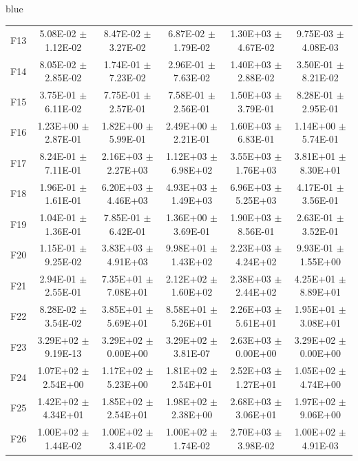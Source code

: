 \documentclass[journal, onecolumn]{IEEEtran}
\begin{document}
\begin{color}{blue}
\begin{table}[htbp!]
\begin{tabular}{c|ccccc}
			F13	 &	5.08E-02	$\pm$	1.12E-02		 &	8.47E-02	$\pm$	3.27E-02		 &	6.87E-02	$\pm$	1.79E-02		 &	1.30E+03	$\pm$	4.67E-02		 &	9.75E-03	$\pm$	4.08E-03	\\	
			F14	 &	8.05E-02	$\pm$	2.85E-02		 &	1.74E-01	$\pm$	7.23E-02		 &	2.96E-01	$\pm$	7.63E-02		 &	1.40E+03	$\pm$	2.88E-02		 &	3.50E-01	$\pm$	8.21E-02	\\	
			F15	 &	3.75E-01	$\pm$	6.11E-02		 &	7.75E-01	$\pm$	2.57E-01		 &	7.58E-01	$\pm$	2.56E-01		 &	1.50E+03	$\pm$	3.79E-01		 &	8.28E-01	$\pm$	2.95E-01	\\	
			F16	 &	1.23E+00	$\pm$	2.87E-01		 &	1.82E+00	$\pm$	5.99E-01		 &	2.49E+00	$\pm$	2.21E-01		 &	1.60E+03	$\pm$	6.83E-01		 &	1.14E+00	$\pm$	5.74E-01	\\	
			F17	 &	8.24E-01	$\pm$	7.11E-01		 &	2.16E+03	$\pm$	2.27E+03		 &	1.12E+03	$\pm$	6.98E+02		 &	3.55E+03	$\pm$	1.76E+03		 &	3.81E+01	$\pm$	8.30E+01	\\	
			F18	 &	1.96E-01	$\pm$	1.61E-01		 &	6.20E+03	$\pm$	4.46E+03		 &	4.93E+03	$\pm$	1.49E+03		 &	6.96E+03	$\pm$	5.25E+03		 &	4.17E-01	$\pm$	3.56E-01	\\	
			F19	 &	1.04E-01	$\pm$	1.36E-01		 &	7.85E-01	$\pm$	6.42E-01		 &	1.36E+00	$\pm$	3.69E-01		 &	1.90E+03	$\pm$	8.56E-01		 &	2.63E-01	$\pm$	3.52E-01	\\	
			F20	 &	1.15E-01	$\pm$	9.25E-02		 &	3.83E+03	$\pm$	4.91E+03		 &	9.98E+01	$\pm$	1.43E+02		 &	2.23E+03	$\pm$	4.24E+02		 &	9.93E-01	$\pm$	1.55E+00	\\	
			F21	 &	2.94E-01	$\pm$	2.55E-01		 &	7.35E+01	$\pm$	7.08E+01		 &	2.12E+02	$\pm$	1.60E+02		 &	2.38E+03	$\pm$	2.44E+02		 &	4.25E+01	$\pm$	8.89E+01	\\	
			F22	 &	8.28E-02	$\pm$	3.54E-02		 &	3.85E+01	$\pm$	5.69E+01		 &	8.58E+01	$\pm$	5.26E+01		 &	2.26E+03	$\pm$	5.61E+01		 &	1.95E+01	$\pm$	3.08E+01	\\	
			F23	 &	3.29E+02	$\pm$	9.19E-13		 &	3.29E+02	$\pm$	0.00E+00		 &	3.29E+02	$\pm$	3.81E-07		 &	2.63E+03	$\pm$	0.00E+00		 &	3.29E+02	$\pm$	0.00E+00	\\	
			F24	 &	1.07E+02	$\pm$	2.54E+00		 &	1.17E+02	$\pm$	5.23E+00		 &	1.81E+02	$\pm$	2.54E+01		 &	2.52E+03	$\pm$	1.27E+01		 &	1.05E+02	$\pm$	4.74E+00	\\	
			F25	 &	1.42E+02	$\pm$	4.34E+01		 &	1.85E+02	$\pm$	2.54E+01		 &	1.98E+02	$\pm$	2.38E+00		 &	2.68E+03	$\pm$	3.06E+01		 &	1.97E+02	$\pm$	9.06E+00	\\	
			F26	 &	1.00E+02	$\pm$	1.44E-02		 &	1.00E+02	$\pm$	3.41E-02		 &	1.00E+02	$\pm$	1.74E-02		 &	2.70E+03	$\pm$	3.98E-02		 &	1.00E+02	$\pm$	4.91E-03	\\	

\end{tabular}
\end{table}
\end{color}
\end{document}
